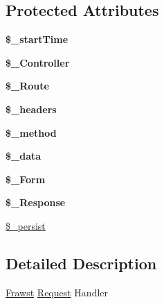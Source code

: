 \subsection*{Protected Attributes}
\begin{DoxyCompactItemize}
\item 
\hypertarget{classRequest_a79c93bbc226b36f8f59c3b856eb72120}{
{\bfseries \$\_\-startTime}}
\label{classRequest_a79c93bbc226b36f8f59c3b856eb72120}

\item 
\hypertarget{classRequest_ad6193d720d21be89331319dd09985c58}{
{\bfseries \$\_\-Controller}}
\label{classRequest_ad6193d720d21be89331319dd09985c58}

\item 
\hypertarget{classRequest_a81f4270e02a1a9243c32b4fb37b360a7}{
{\bfseries \$\_\-Route}}
\label{classRequest_a81f4270e02a1a9243c32b4fb37b360a7}

\item 
\hypertarget{classRequest_a52b9fd804e2fd8038f325fa7601274d2}{
{\bfseries \$\_\-headers}}
\label{classRequest_a52b9fd804e2fd8038f325fa7601274d2}

\item 
\hypertarget{classRequest_a2555f1eb5ec20322e0032fe1d0359687}{
{\bfseries \$\_\-method}}
\label{classRequest_a2555f1eb5ec20322e0032fe1d0359687}

\item 
\hypertarget{classRequest_aad7894a284ec13d0c720a9c18db06151}{
{\bfseries \$\_\-data}}
\label{classRequest_aad7894a284ec13d0c720a9c18db06151}

\item 
\hypertarget{classRequest_aba57a9def753ffdf8e5c037372df974b}{
{\bfseries \$\_\-Form}}
\label{classRequest_aba57a9def753ffdf8e5c037372df974b}

\item 
\hypertarget{classRequest_aa885eff8edc7e0361676bff6528915f6}{
{\bfseries \$\_\-Response}}
\label{classRequest_aa885eff8edc7e0361676bff6528915f6}

\item 
\hyperlink{classRequest_a6529301fb8d03a3724f00c0f625accce}{\$\_\-persist}
\end{DoxyCompactItemize}


\subsection{Detailed Description}
\hyperlink{classFrawst}{Frawst} \hyperlink{classRequest}{Request} Handler

